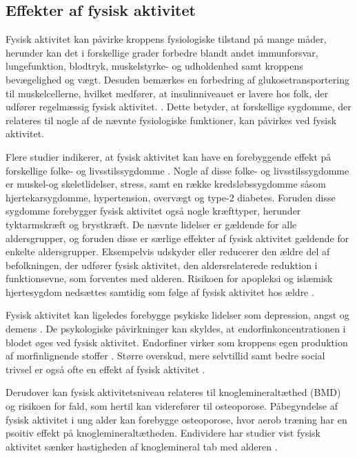 \subsection{Effekter af fysisk aktivitet}\label{sec:effekterafaktivitet}
Fysisk aktivitet kan påvirke kroppens fysiologiske tilstand på mange måder, herunder kan det i forskellige grader forbedre blandt andet immunforsvar, lungefunktion, blodtryk, muskelstyrke- og udholdenhed samt kroppens bevægelighed og vægt. Desuden bemærkes en forbedring af glukosetransportering til muskelcellerne, hvilket medfører, at insulinniveauet er lavere hos folk, der udfører regelmæssig fysisk aktivitet. \citep{andersen2001, martini2015}. Dette betyder, at forskellige sygdomme, der relateres til nogle af de nævnte fysiologiske funktioner, kan påvirkes ved fysisk aktivitet.

Flere studier indikerer, at fysisk aktivitet kan have en forebyggende effekt på forskellige folke- og livsstilssygdomme \citep{warburton2010}. Nogle af disse folke- og livsstilssygdomme er muskel-og skeletlidelser, stress, samt en række kredsløbssygdomme såsom hjertekarsygdomme, hypertension, overvægt og type-2 diabetes. Foruden disse sygdomme forebygger fysisk aktivitet også nogle kræfttyper, herunder tyktarmskræft og brystkræft. De nævnte lidelser er gældende for alle aldersgrupper, og foruden disse er særlige effekter af fysisk aktivitet gældende for enkelte aldersgrupper. Eksempelvis udskyder eller reducerer den ældre del af befolkningen, der udfører fysisk aktivitet, den aldersrelaterede reduktion i funktionsevne, som forventes med alderen. Risikoen for apopleksi og islæmisk hjertesygdom nedsættes samtidig som følge af fysisk aktivitet hos ældre \citep{pedersen2011,
warburton2010}. 

Fysisk aktivitet kan ligeledes forebygge psykiske lidelser som depression, angst og demens \citep{pedersen2011}. De psykologiske påvirkninger kan skyldes, at endorfinkoncentrationen i blodet øges ved fysisk aktivitet. Endorfiner virker som kroppens egen produktion af morfinlignende stoffer \citep{kessing2016}. Større overskud, mere selvtillid samt bedre social trivsel er også ofte en effekt af fysisk aktivitet \citep{sundhedsstyrelsen2006}. 


Derudover kan fysisk aktivitetsniveau relateres til knoglemineraltæthed (BMD) og risikoen for fald, som hertil kan viderefører til osteoporose. Påbegyndelse af fysisk aktivitet i ung alder kan forebygge osteoporose, hvor aerob træning har en psoitiv effekt på knoglemineraltætheden. Endividere har studier vist fysisk aktivitet sænker hastigheden af knoglemineral tab med alderen \citep{kilde1og2}. 


